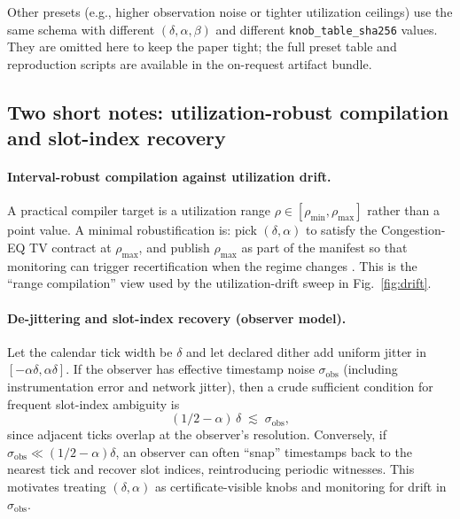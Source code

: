 \documentclass[11pt]{article}
\theoremstyle{definition}
\theoremstyle{remark}
\begin{document}
\smallskip
\noindent Other presets (e.g., higher observation noise or tighter utilization ceilings) use the same schema with different $(\delta,\alpha,\beta)$ and different \texttt{knob\_table\_sha256} values. They are omitted here to keep the paper tight; the full preset table and reproduction scripts are available in the on-request artifact bundle.

\subsection{Two short notes: utilization-robust compilation and slot-index recovery}
\paragraph{Interval-robust compilation against utilization drift.}
A practical compiler target is a utilization range $\rho\in[\rho_{\min},\rho_{\max}]$ rather than a point value.
A minimal robustification is: pick $(\delta,\alpha)$ to satisfy the Congestion-EQ TV contract at $\rho_{\max}$,
and publish $\rho_{\max}$ as part of the manifest so that monitoring can trigger recertification when the regime changes \cite{series:recert}.
This is the ``range compilation'' view used by the utilization-drift sweep in Fig.~\ref{fig:drift}.

\paragraph{De-jittering and slot-index recovery (observer model).}
Let the calendar tick width be $\delta$ and let declared dither add uniform jitter in $[-\alpha\delta,\alpha\delta]$.
If the observer has effective timestamp noise $\sigma_{\mathrm{obs}}$ (including instrumentation error and network jitter),
then a crude sufficient condition for frequent slot-index ambiguity is
\[
(1/2-\alpha)\,\delta \;\lesssim\; \sigma_{\mathrm{obs}},
\]
since adjacent ticks overlap at the observer's resolution.
Conversely, if $\sigma_{\mathrm{obs}}\ll (1/2-\alpha)\delta$, an observer can often ``snap'' timestamps back to the nearest tick
and recover slot indices, reintroducing periodic witnesses. This motivates treating $(\delta,\alpha)$ as certificate-visible knobs
and monitoring for drift in $\sigma_{\mathrm{obs}}$.
\end{document}

